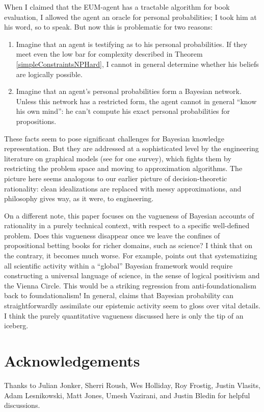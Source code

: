 \documentclass[letterpaper,12pt]{article}
\begin{document}
When I claimed that the EUM-agent has a tractable algorithm for book evaluation, I allowed the agent an oracle for personal probabilities; I took him at his word, so to speak. But now this is problematic for two reasons:
\begin{enumerate}
\item
Imagine that an agent is testifying as to his personal probabilities. If they meet even the low bar for complexity described in Theorem \ref{simpleConstraintsNPHard}, I cannot in general determine whether his beliefs are logically possible.
\item
Imagine that an agent's personal probabilities form a Bayesian network. Unless this network has a restricted form, the agent cannot in general ``know his own mind'': he can't compute his exact personal probabilities for propositions.
\end{enumerate}

These facts seem to pose significant challenges for Bayesian knowledge representation. But they are addressed at a sophisticated level by the engineering literature on graphical models (see \cite{citeulike:3470282} for one survey), which fights them by restricting the problem space and moving to approximation algorithms. The picture here seems analogous to our earlier picture of decision-theoretic rationality: clean idealizations are replaced with messy approximations, and philosophy gives way, as it were, to engineering.

On a different note, this paper focuses on the vagueness of Bayesian accounts of rationality in a purely technical context, with respect to a specific well-defined problem. Does this vagueness disappear once we leave the confines of propositional betting books for richer domains, such as science? I think that on the contrary, it becomes much worse. For example, \cite{garber1983} points out that systematizing all scientific activity within a ``global'' Bayesian framework would require constructing a universal language of science, in the sense of logical positivism and the Vienna Circle. This would be a striking regression from anti-foundationalism back to foundationalism! In general, claims that Bayesian probability can straightforwardly assimilate our epistemic activity seem to gloss over vital details. I think the purely quantitative vagueness discussed here is only the tip of an iceberg.

\section{Acknowledgements}
Thanks to Julian Jonker, Sherri Roush, Wes Holliday, Roy Frostig, Justin Vlasits, Adam Lesnikowski, Matt Jones, Umesh Vazirani, and Justin Bledin for helpful discussions.


\end{document}
